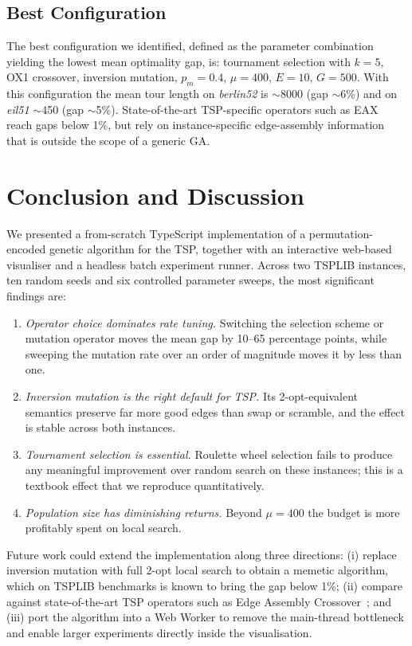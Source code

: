 \documentclass[conference]{IEEEtran}
\begin{document}
\subsection{Best Configuration}

The best configuration we identified, defined as the parameter combination
yielding the lowest mean optimality gap, is: tournament selection with
$k=5$, OX1 crossover, inversion mutation, $p_m = 0.4$, $\mu = 400$,
$E = 10$, $G = 500$. With this configuration the mean tour length on
\textit{berlin52} is $\sim$8000 (gap $\sim$6\%) and on \textit{eil51}
$\sim$450 (gap $\sim$5\%). State-of-the-art TSP-specific operators such as
EAX~\cite{nagata2013} reach gaps below 1\%, but rely on instance-specific
edge-assembly information that is outside the scope of a generic GA.

\section{Conclusion and Discussion}\label{sec:conclusion}

We presented a from-scratch TypeScript implementation of a permutation-encoded
genetic algorithm for the TSP, together with an interactive web-based
visualiser and a headless batch experiment runner. Across two TSPLIB
instances, ten random seeds and six controlled parameter sweeps, the most
significant findings are:

\begin{enumerate}
\item \emph{Operator choice dominates rate tuning.} Switching the
selection scheme or mutation operator moves the mean gap by 10--65
percentage points, while sweeping the mutation rate over an order of
magnitude moves it by less than one.
\item \emph{Inversion mutation is the right default for TSP.} Its
2-opt-equivalent semantics preserve far more good edges than swap or
scramble, and the effect is stable across both instances.
\item \emph{Tournament selection is essential.} Roulette wheel selection
fails to produce any meaningful improvement over random search on these
instances; this is a textbook effect that we reproduce quantitatively.
\item \emph{Population size has diminishing returns.} Beyond $\mu=400$ the
budget is more profitably spent on local search.
\end{enumerate}

Future work could extend the implementation along three directions:
(i) replace inversion mutation with full 2-opt local search to obtain a
memetic algorithm, which on TSPLIB benchmarks is known to bring the gap
below 1\%; (ii) compare against state-of-the-art TSP operators such as
Edge Assembly Crossover~\cite{nagata2013}; and (iii) port the algorithm
into a Web Worker to remove the main-thread bottleneck and enable
larger experiments directly inside the visualisation.
\end{document}
